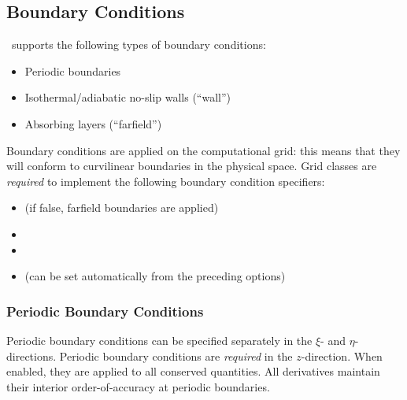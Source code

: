 \documentclass[letterpaper,10pt]{article}
\begin{document}




\subsection{Boundary Conditions}

\code\ supports the following types of boundary conditions:
\begin{itemize}
\item Periodic boundaries
\item Isothermal/adiabatic no-slip walls (``wall'')
\item Absorbing layers (``farfield'')
\end{itemize}
Boundary conditions are applied on the computational grid: this means that they will conform to curvilinear boundaries in the physical space. Grid classes are \emph{required} to implement the following boundary condition specifiers:
\begin{itemize}
\item {} (if false, farfield boundaries are applied)
\item {}
\item {}
\item {} (can be set automatically from the preceding options)
\end{itemize}


\subsubsection{Periodic Boundary Conditions}
Periodic boundary conditions can be specified separately in the $\xi$- and $\eta$-directions. Periodic boundary conditions are \emph{required} in the $z$-direction. When enabled, they are applied to all conserved quantities. All derivatives maintain their interior order-of-accuracy at periodic boundaries.
\end{document}

